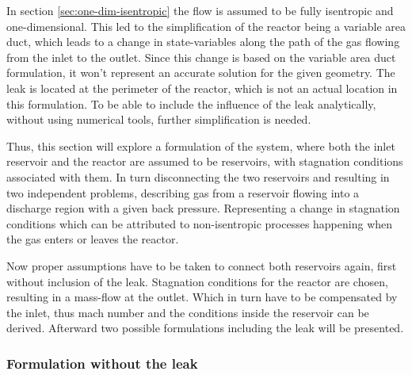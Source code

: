 In section \ref{sec:one-dim-isentropic} the flow is assumed to be fully isentropic and one-dimensional.
This led to the simplification of the reactor being a variable area duct, which leads to a change in state-variables along the path of the gas flowing from the inlet to the outlet.
Since this change is based on the variable area duct formulation, it won't represent an accurate solution for the given geometry.
The leak is located at the perimeter of the reactor, which is not an actual location in this formulation.
To be able to include the influence of the leak analytically, without using numerical tools, further simplification is needed.

Thus, this section will explore a formulation of the system, where both the inlet reservoir and the reactor are assumed to be reservoirs, with stagnation conditions associated with them.
In turn disconnecting the two reservoirs and resulting in two independent problems, describing gas from a reservoir flowing into a discharge region with a given back pressure. 
Representing a change in stagnation conditions which can be attributed to non-isentropic processes happening when the gas enters or leaves the reactor.

Now proper assumptions have to be taken to connect both reservoirs again, first without inclusion of the leak.
Stagnation conditions for the reactor are chosen, resulting in a mass-flow at the outlet.
Which in turn have to be compensated by the inlet, thus mach number and the conditions inside the reservoir can be derived.  
Afterward two possible formulations including the leak will be presented.

\subsubsection*{Formulation without the leak}

